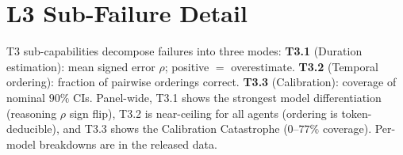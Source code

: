 \documentclass{article}
\begin{document}
\section{L3 Sub-Failure Detail}\label{app:l3detail}

T3 sub-capabilities decompose failures into three modes:
\textbf{T3.1} (Duration estimation): mean signed error $\rho$; positive $=$ overestimate.
\textbf{T3.2} (Temporal ordering): fraction of pairwise orderings correct.
\textbf{T3.3} (Calibration): coverage of nominal $90\%$ CIs.
Panel-wide, T3.1 shows the strongest model differentiation (reasoning $\rho$ sign flip), T3.2 is near-ceiling for all agents (ordering is token-deducible), and T3.3 shows the Calibration Catastrophe ($0$--$77\%$ coverage). Per-model breakdowns are in the released data.
\end{document}
